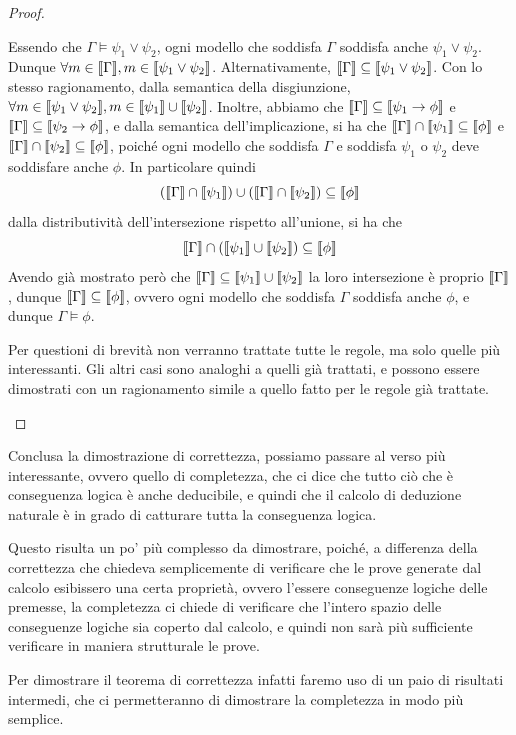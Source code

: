 \begin{proof}
\begin{description}
    Essendo che \(\Gamma\models \psi_1 \lor \psi_2\), ogni modello che soddisfa \(\Gamma\) soddisfa anche \(\psi_1\lor\psi_2\). Dunque \(\forall m \in \den{\Gamma}, m \in \den{\psi_1\lor\psi_2}\). Alternativamente, \(\den{\Gamma}\subseteq \den{\psi_1\lor\psi_2}\). Con lo stesso ragionamento, dalla semantica della disgiunzione, \(\forall m \in \den{\psi_1\lor\psi_2}, m \in \den{\psi_1}\cup \den{\psi_2}\). Inoltre, abbiamo che \(\den{\Gamma}\subseteq\den{\psi_1\to\phi}\) e \(\den{\Gamma}\subseteq\den{\psi_2\to\phi}\), e dalla semantica dell'implicazione, si ha che \(\den{\Gamma} \cap \den{\psi_1}\subseteq\den{\phi}\) e \(\den{\Gamma}\cap\den{\psi_2}\subseteq\den{\phi}\), poiché ogni modello che soddisfa \(\Gamma\) e soddisfa \(\psi_1\) o \(\psi_2\) deve soddisfare anche \(\phi\). In particolare quindi
    \[(\den{\Gamma}\cap\den{\psi_1})\cup(\den{\Gamma}\cap\den{\psi_2})\subseteq \den{\phi}\]
    dalla distributività dell'intersezione rispetto all'unione, si ha che
    \[\den{\Gamma} \cap (\den{\psi_1}\cup\den{\psi_2})\subseteq\den{\phi}\]
    Avendo già mostrato però che \(\den{\Gamma} \subseteq \den{\psi_1}\cup\den{\psi_2}\) la loro intersezione è proprio \(\den{\Gamma}\),
    dunque \(\den{\Gamma}\subseteq \den{\phi}\), ovvero ogni modello che soddisfa \(\Gamma\) soddisfa anche \(\phi\), e dunque \(\Gamma\models\phi\).
    \item[] Per questioni di brevità non verranno trattate tutte le regole, ma solo quelle più interessanti. Gli altri casi sono analoghi a quelli già trattati, e possono essere dimostrati con un ragionamento simile a quello fatto per le regole già trattate.
  \end{description}
\end{proof}

Conclusa la dimostrazione di correttezza, possiamo passare al verso più interessante, ovvero quello di completezza, che ci dice che tutto ciò che è conseguenza logica è anche deducibile, e quindi che il calcolo di deduzione naturale è in grado di catturare tutta la conseguenza logica.

Questo risulta un po' più complesso da dimostrare, poiché, a differenza della correttezza che chiedeva semplicemente di verificare che le prove generate dal calcolo esibissero una certa proprietà, ovvero l'essere conseguenze logiche delle premesse, la completezza ci chiede di verificare che l'intero spazio delle conseguenze logiche sia coperto dal calcolo, e quindi non sarà più sufficiente verificare in maniera strutturale le prove.

Per dimostrare il teorema di correttezza infatti faremo uso di un paio di risultati intermedi, che ci permetteranno di dimostrare la completezza in modo più semplice.

